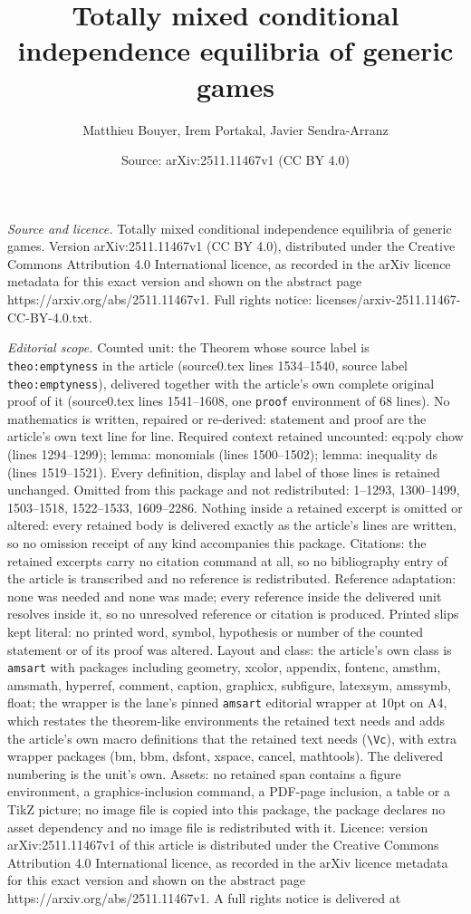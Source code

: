 \documentclass[10pt,a4paper]{amsart}
\title[Totally mixed conditional independence equilibria of generic]{Totally mixed conditional independence equilibria of generic games}
\author{Matthieu Bouyer, Irem Portakal, Javier Sendra-Arranz}
\date{Source: arXiv:2511.11467v1 (CC BY 4.0)}
\begin{document}
\maketitle

\noindent\emph{Source and licence.} Totally mixed conditional independence equilibria of generic games. Version arXiv:2511.11467v1 (CC BY 4.0), distributed under the Creative Commons Attribution 4.0 International licence, as recorded in the arXiv licence metadata for this exact version and shown on the abstract page https://arxiv.org/abs/2511.11467v1. Full rights notice: licenses/arxiv-2511.11467-CC-BY-4.0.txt.\par\smallskip

\noindent\textit{Editorial scope.} Counted unit: the Theorem whose source label is \texttt{theo:emptyness} in the article (source0.tex lines 1534--1540, source label \texttt{theo:emptyness}), delivered together with the article's own complete original proof of it (source0.tex lines 1541--1608, one \texttt{proof} environment of 68 lines). No mathematics is written, repaired or re-derived: statement and proof are the article's own text line for line. Required context retained uncounted: eq:poly chow (lines 1294--1299); lemma: monomials (lines 1500--1502); lemma: inequality ds (lines 1519--1521). Every definition, display and label of those lines is retained unchanged. Omitted from this package and not redistributed: 1--1293, 1300--1499, 1503--1518, 1522--1533, 1609--2286. Nothing inside a retained excerpt is omitted or altered: every retained body is delivered exactly as the article's lines are written, so no omission receipt of any kind accompanies this package. Citations: the retained excerpts carry no citation command at all, so no bibliography entry of the article is transcribed and no reference is redistributed. Reference adaptation: none was needed and none was made; every reference inside the delivered unit resolves inside it, so no unresolved reference or citation is produced. Printed slips kept literal: no printed word, symbol, hypothesis or number of the counted statement or of its proof was altered. Layout and class: the article's own class is \texttt{amsart} with packages including geometry, xcolor, appendix, fontenc, amsthm, amsmath, hyperref, comment, caption, graphicx, subfigure, latexsym, amssymb, float; the wrapper is the lane's pinned \texttt{amsart} editorial wrapper at 10pt on A4, which restates the theorem-like environments the retained text needs and adds the article's own macro definitions that the retained text needs (\texttt{\textbackslash Vc}), with extra wrapper packages (bm, bbm, dsfont, xspace, cancel, mathtools). The delivered numbering is the unit's own. Assets: no retained span contains a figure environment, a graphics-inclusion command, a PDF-page inclusion, a table or a TikZ picture; no image file is copied into this package, the package declares no asset dependency and no image file is redistributed with it. Licence: version arXiv:2511.11467v1 of this article is distributed under the Creative Commons Attribution 4.0 International licence, as recorded in the arXiv licence metadata for this exact version and shown on the abstract page https://arxiv.org/abs/2511.11467v1. A full rights notice is delivered at 
\end{document}
